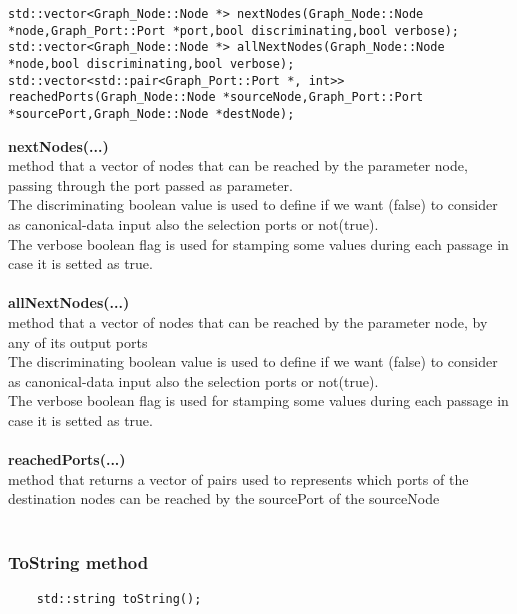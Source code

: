 \documentclass{article}
\begin{document}
\begin{mdframed}[hidealllines=true, backgroundcolor=magenta!10]
	\begin{lstlisting}[basicstyle=\tiny]
std::vector<Graph_Node::Node *> nextNodes(Graph_Node::Node *node,Graph_Port::Port *port,bool discriminating,bool verbose);
std::vector<Graph_Node::Node *> allNextNodes(Graph_Node::Node *node,bool discriminating,bool verbose);
std::vector<std::pair<Graph_Port::Port *, int>> reachedPorts(Graph_Node::Node *sourceNode,Graph_Port::Port *sourcePort,Graph_Node::Node *destNode);
	\end{lstlisting}
\end{mdframed}

\textbf{nextNodes(...)}\\
method that a vector of nodes that can be reached by the parameter node, passing through the port passed as parameter.\\
The discriminating boolean value is used to define if we want (false) to consider as canonical-data input also the selection ports or not(true).\\
The verbose boolean flag is used for stamping some values during each passage in case it is setted as true.\\\\

\textbf{allNextNodes(...)}\\
method that a vector of nodes that can be reached by the parameter node, by any of its output ports\\
The discriminating boolean value is used to define if we want (false) to consider as canonical-data input also the selection ports or not(true).\\
The verbose boolean flag is used for stamping some values during each passage in case it is setted as true.\\\\

\textbf{reachedPorts(...)}\\
method that returns a vector of pairs used to represents which ports of the destination nodes can be reached by the sourcePort of the sourceNode\\\\

\subsubsection{ToString method}

\begin{mdframed}[hidealllines=true, backgroundcolor=magenta!10]
	\begin{lstlisting}
	std::string toString();
	\end{lstlisting}
\end{mdframed}
\end{document}
